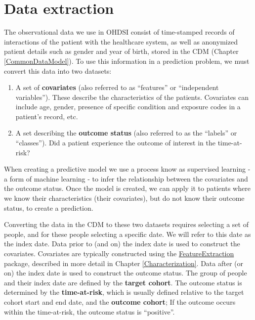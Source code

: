 \documentclass[11pt]{book}
\providecommand{\tightlist}{%
  \setlength{\itemsep}{0pt}\setlength{\parskip}{0pt}}
\theoremstyle{definition}
\theoremstyle{definition}
\theoremstyle{definition}
\theoremstyle{remark}
\begin{document}
\hypertarget{data-extraction-2}{%
\section{Data extraction}\label{data-extraction-2}}

The observational data we use in OHDSI consist of time-stamped records of interactions of the patient with the healthcare system, as well as anonymized patient details such as gender and year of birth, stored in the CDM (Chapter \ref{CommonDataModel}). To use this information in a prediction problem, we must convert this data into two datasets:

\begin{enumerate}
\def\labelenumi{\arabic{enumi}.}
\tightlist
\item
  A set of \textbf{covariates} (also referred to as ``features'' or ``independent variables''). These describe the characteristics of the patients. Covariates can include age, gender, presence of specific condition and exposure codes in a patient's record, etc. 
\item
  A set describing the \textbf{outcome status} (also referred to as the ``labels'' or ``classes''). Did a patient experience the outcome of interest in the time-at-risk?   
\end{enumerate}

When creating a predictive model we use a process know as supervised learning - a form of machine learning - to infer the relationship between the covariates and the outcome status. Once the model is created, we can apply it to patients where we know their characteristics (their covariates), but do not know their outcome status, to create a prediction. 

Converting the data in the CDM to these two datasets requires selecting a set of people, and for these people selecting a specific date. We will refer to this date as the index date. Data prior to (and on) the index date is used to construct the covariates. Covariates are typically constructed using the \href{https://ohdsi.github.io/FeatureExtraction/}{FeatureExtraction} package, described in more detail in Chapter \ref{Characterization}. Data after (or on) the index date is used to construct the outcome status. The group of people and their index date are defined by the \textbf{target cohort}. The outcome status is determined by the \textbf{time-at-risk}, which is usually defined relative to the target cohort start and end date, and the \textbf{outcome cohort}; If the outcome occurs within the time-at-risk, the outcome status is ``positive''. 
\end{document}
